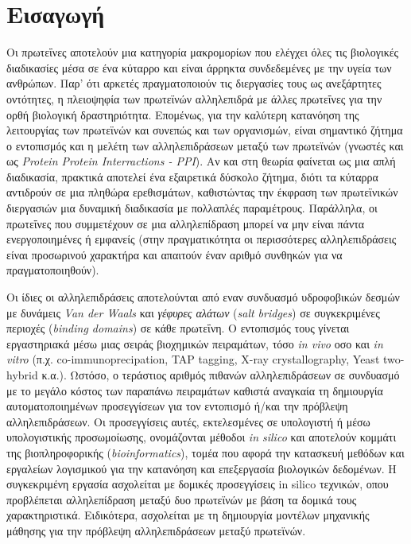 
\chapter*{Εισαγωγή}

Οι πρωτεΐνες αποτελούν μια κατηγορία μακρομορίων που ελέγχει όλες τις βιολογικές διαδικασίες μέσα σε ένα κύταρρο και είναι άρρηκτα συνδεδεμένες με την υγεία των ανθρώπων. Παρ' ότι αρκετές πραγματοποιούν τις διεργασίες τους ως ανεξάρτητες οντότητες, η πλειοψηφία των πρωτεϊνών αλληλεπιδρά με άλλες πρωτεΐνες για την ορθή βιολογική δραστηριότητα. Επομένως, για την καλύτερη κατανόηση της λειτουργίας των πρωτεϊνών και συνεπώς και των οργανισμών, είναι σημαντικό ζήτημα ο εντοπισμός και η μελέτη των αλληλεπιδράσεων μεταξύ των πρωτεϊνών (γνωστές και ως \textit{Protein Protein Interractions - PPI}). Αν και στη θεωρία φαίνεται ως μια απλή διαδικασία, πρακτικά αποτελεί ένα εξαιρετικά δύσκολο ζήτημα, διότι τα κύταρρα αντιδρούν σε μια πληθώρα ερεθισμάτων, καθιστώντας την έκφραση των πρωτεϊνικών διεργασιών μια δυναμική διαδικασία με πολλαπλές παραμέτρους. Παράλληλα, οι πρωτεΐνες που συμμετέχουν σε μια αλληλεπίδραση μπορεί να μην είναι πάντα ενεργοποιημένες ή εμφανείς (στην πραγματικότητα οι περισσότερες αλληλεπιδράσεις είναι προσωρινού χαρακτήρα και απαιτούν έναν αριθμό συνθηκών για να πραγματοποιηθούν). 

\medskip
Οι ίδιες οι αλληλεπιδράσεις αποτελούνται από εναν συνδυασμό υδροφοβικών δεσμών με δυνάμεις \textit{Van der Waals} και \textit{γέφυρες αλάτων} (\textit{salt bridges}) σε συγκεκριμένες περιοχές (\textit{binding domains}) σε κάθε πρωτεΐνη. Ο εντοπισμός τους γίνεται εργαστηριακά μέσω μιας σειράς βιοχημικών πειραμάτων, τόσο \textit{in vivo} οσο και \textit{in vitro} (π.χ. co-immunoprecipation, TAP tagging, X-ray crystallography, Yeast two-hybrid κ.α.). Ωστόσο, ο τεράστιος αριθμός πιθανών αλληλεπιδράσεων σε συνδυασμό με το μεγάλο κόστος των παραπάνω πειραμάτων καθιστά αναγκαία τη δημιουργία αυτοματοποιημένων προσεγγίσεων για τον εντοπισμό ή/και την πρόβλεψη αλληλεπιδράσεων. Οι προσεγγίσεις αυτές, εκτελεσμένες σε υπολογιστή ή μέσω υπολογιστικής προσωμοίωσης, ονομάζονται μέθοδοι \textit{in silico} και αποτελούν κομμάτι της βιοπληροφορικής (\textit{bioinformatics}), τομέα που αφορά την κατασκευή μεθόδων και εργαλείων λογισμικού για την κατανόηση και επεξεργασία βιολογικών δεδομένων. Η συγκεκριμένη εργασία ασχολείται με δομικές προσεγγίσεις in silico τεχνικών, οπου προβλέπεται αλληλεπίδραση μεταξύ δυο πρωτεϊνών με βάση τα δομικά τους χαρακτηριστικά. Ειδικότερα, ασχολείται με τη δημιουργία μοντέλων μηχανικής μάθησης για την πρόβλεψη αλληλεπιδράσεων μεταξύ πρωτεϊνών.

